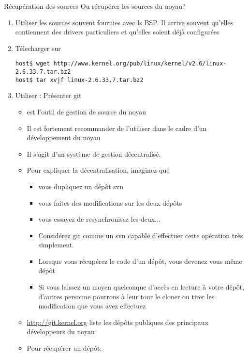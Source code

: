 \begin{frame}[fragile=singleslide]{Récupération des sources}
  Ou récupérer les sources du noyau?
  \begin{enumerate}
  \item Utiliser les sources souvent  fournies avec ls BSP.  Il arrive
    souvent qu'elles contiennent  des drivers particuliers et qu'elles
    soient déjà configurées
  \item Télecharger sur 
    \begin{lstlisting}
host$ wget http://www.kernel.org/pub/linux/kernel/v2.6/linux-2.6.33.7.tar.bz2
host$ tar xvjf linux-2.6.33.7.tar.bz2
    \end{lstlisting}
  \item Utiliser :
    \note[item] Présenter git
    \begin{itemize} 
    \item {} est l'outil de gestion de source du noyau
    \item  Il est fortement  recommander de  l'utiliser dans  le cadre
      d'un développement du noyau
    \item Il s'agit d'un système de gestion décentralisé. 
    \item Pour expliquer la décentralisation, imaginez que
      \begin{itemize} 
      \item vous dupliquez un dépôt svn
      \item vous faites des modifications sur les deux dépôts
      \item vous essayez de resynchronisez les deux...
      \item  Considérez git  comme  un svn  capable d'effectuer  cette
        opération très simplement.
      \item Lorsque  vous récupérez le  code d'un dépôt,  vous devenez
        vous même dépôt
      \item Si vous  laissez un moyen quelconque d'accès  en lecture à
        votre dépôt, d'autres personne  pourrons à leur tour le cloner
        ou tirer les modification que vous avez effectuez
      \end{itemize} 
    \item \url{http://git.kernel.org}  liste les dépôts  publiques des
      principaux développeurs du noyau
    \item Pour récupérer un dépôt:

\end{itemize}
\end{enumerate}
\end{frame}
